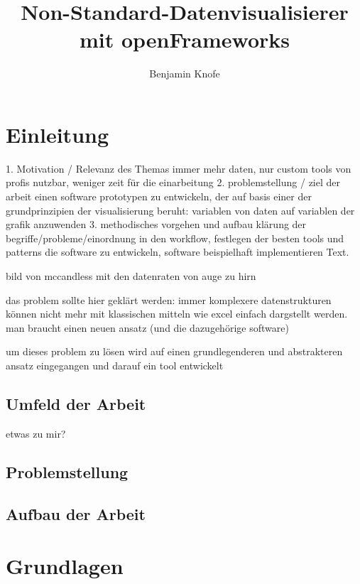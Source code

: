 \documentclass[a4paper, 12pt, onepage, pdftex, headsepline, footsepline]{scrreprt}
\begin{document}
\title{Non-Standard-Datenvisualisierer mit openFrameworks}
\author{Benjamin Knofe}
\subject{Diplomarbeit}
\publishers{Hochschule für Technik, Wirtschaft und Kultur Leipzig}
\dedication{viele nette Leute}
\maketitle
\tableofcontents
\chapter{Einleitung}
\label{sec:testi}

1. Motivation / Relevanz des Themas
immer mehr daten, nur custom tools von profis nutzbar, weniger zeit für die einarbeitung
2. problemstellung / ziel der arbeit
einen software prototypen zu entwickeln, der auf basis einer der grundprinzipien der visualisierung beruht: variablen von daten auf variablen der grafik anzuwenden
3. methodisches vorgehen und aufbau
klärung der begriffe/probleme/einordnung in den workflow, festlegen der besten tools und patterns die software zu entwickeln, software beispielhaft implementieren Text.

bild von mccandless mit den datenraten von auge zu hirn

das problem sollte hier geklärt werden:
immer komplexere datenstrukturen können nicht mehr mit klassischen mitteln wie excel einfach dargstellt werden. man braucht einen neuen ansatz (und die dazugehörige software)

um dieses problem zu lösen wird auf einen grundlegenderen und abstrakteren ansatz eingegangen und darauf ein tool entwickelt
\section{Umfeld der Arbeit}
etwas zu mir?
\section{Problemstellung}
\section{Aufbau der Arbeit}

\chapter{Grundlagen}
\end{document}
